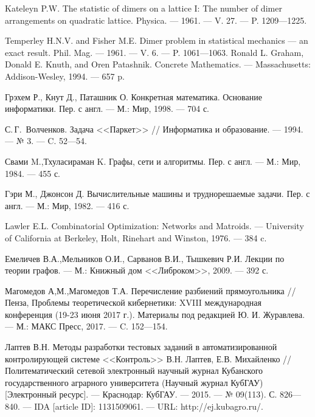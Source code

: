 \begin{thebibliography}{111}




Kateleyn P.W. The statistic of dimers on a lattice I: The number of dimer arrangements on quadratic lattice.
Physica. --- 1961. --- V. 27. --- P. 1209---1225.

Temperley H.N.V. and Fisher M.E.
Dimer problem in statistical mechanics --- an exact result.
 Phil. Mag. --- 1961. --- V. 6. --- P. 1061---1063.
%
Ronald L. Graham, Donald E. Knuth, and Oren Patashnik.
Concrete Mathematics. --- Massachusetts: Addison-Wesley, 1994. --- 657 p.

Грэхем Р., Кнут Д., Паташник О.
Конкретная математика. Основание информатики. Пер. с англ. ---
М.: Мир, 1998. --- 704 с.
%

С.\,Г.~Волченков. Задача <<Паркет>> // Информатика и образование. --- 1994.
 --- № 3. --- C. 52---54.

Свами M.,Тхуласираман K. Графы, сети и алгоритмы. Пер. с англ. --- М.: Мир, 1984. --- 455 с.

Гэри М., Джонсон Д. Вычислительные машины и труднорешаемые задачи. Пер. с англ. --- М.: Мир, 1982. --- 416 с.

Lawler E.L. Combinatorial Optimization: Networks and Matroids. ---
University of California at Berkeley, Holt, Rinehart and Winston,  1976. --- 384 c.

Емеличев В.А.,Мельников О.И., Сарванов В.И., Тышкевич Р.И.
Лекции по теории графов. --- М.: Книжный дом <<Либроком>>, 2009. --- 392 с.

Магомедов А,М.,Магомедов Т.А.
Перечисление разбиений прямоугольника // Пенза, Проблемы теоретической кибернетики: XVIII международная конференция (19-23 июня 2017 г.). Материалы под редакцией Ю. И. Журавлева. --- М.: МАКС Пресс, 2017. --- C. 152---154.









Лаптев В.Н. Методы разработки тестовых заданий в автоматизированной контролирующей системе <<Контроль>> В.Н. Лаптев, Е.В. Михайленко // Политематический сетевой электронный научный журнал Кубанского государственного аграрного университета (Научный журнал КубГАУ) [Электронный ресурс]. --- Краснодар: КубГАУ. --- 2015. --- № 09(113). С. 826---840. --- IDA [article ID]: 1131509061. --- URL: http://ej.kubagro.ru/.


\end{thebibliography}
